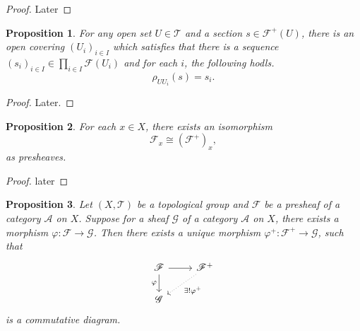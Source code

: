 \documentclass{article}
\newtheorem{proposition}{Proposition}[section]
\numberwithin{equation}{section}
\begin{document}
\begin{proof}
Later
\end{proof}

\begin{proposition}
\label{section_rep}
For any open set $U\in\mathcal{T}$ and a section $s\in\mathcal{F}^+(U)$, there is an open covering $(U_i)_{i\in I}$ which satisfies that there is a sequence $(s_i)_{i\in I}\in\prod_{i\in I}\mathcal{F}(U_i)$ and for each $i$, the following hodls.
\begin{equation*}
\rho_{UU_i}(s)=s_i.
\end{equation*}
\end{proposition}
\begin{proof}
Later.
\end{proof}

\begin{proposition}
For each $x\in X$, there exists an isomorphism
\begin{equation*}
\mathcal{F}_x\cong (\mathcal{F}^+)_x,
\end{equation*}
as presheaves.
\end{proposition}

\begin{proof}
later
\end{proof}

\begin{proposition}
Let $(X,\mathcal{T})$ be a topological group and $\mathcal{F}$ be a presheaf of a category $\mathcal{A}$ on $X$. Suppose for a sheaf $\mathcal{G}$ of a category $\mathcal{A}$ on $X$, there exists a morphism $\varphi:\mathcal{F}\to\mathcal{G}$. Then there exists a unique morphism $\varphi^+:\mathcal{F}^+\to\mathcal{G}$, such that
\[
\begin{tikzcd}
\mathcal{F} \arrow[d, "\varphi"'] \arrow[r] & \mathcal{F}^+ \arrow[ld, "\exists!\varphi^+", dotted] \\
\mathcal{G}                                 &                                                      
\end{tikzcd}
\]
is a commutative diagram.
\label{sheaf_morphism_universal_property}
\end{proposition}
\end{document}
